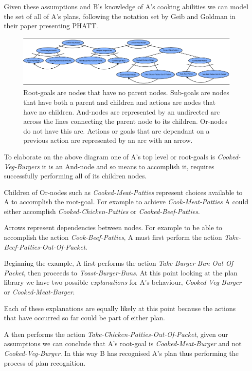 \documentclass[parskip]{cs4rep}
\begin{document}
Given these assumptions and B's knowledge of A's cooking abilities we can model the set of all of A's plans, following the notation set by Geib and Goldman in their paper presenting PHATT.

\begin{figure}[h]
\centerline{
	\includegraphics{images/example-plan-library}
}
\caption{Root-goals are nodes that have no parent nodes. Sub-goals are nodes that have both a parent and children and actions are nodes that have no children. And-nodes are represented by an undirected arc across the lines connecting the parent node to its children. Or-nodes do not have this arc. Actions or goals that are dependant on a previous action are represented by an arc with an arrow.}
\label{fig:example-plan-library}
\end{figure}

To elaborate on the above diagram one of A's top level or root-goals is \textit{Cooked-Veg-Burgers} it is an And-node and so means to accomplish it, requires successfully performing all of its children nodes. 

Children of Or-nodes such as \textit{Cooked-Meat-Patties} represent choices available to A to accomplish the root-goal. For example to achieve \textit{Cook-Meat-Patties} A could either accomplish \textit{Cooked-Chicken-Patties} or \textit{Cooked-Beef-Patties}.

Arrows represent dependencies between nodes. For example to be able to accomplish the action \textit{Cook-Beef-Patties}, A must first perform the action \textit{Take-Beef-Patties-Out-Of-Packet}.

Beginning the example, A first performs the action \textit{Take-Burger-Bun-Out-Of-Packet}, then proceeds to \textit{Toast-Burger-Buns}. At this point looking at the plan library we have two possible \textit{explanations} for A's behaviour, \textit{Cooked-Veg-Burger} or \textit{Cooked-Meat-Burger}.

Each of these explanations are equally likely at this point because the actions that have occurred so far could be part of either plan.

A then performs the action \textit{Take-Chicken-Patties-Out-Of-Packet}, given our assumptions we can conclude that A's root-goal is \textit{Cooked-Meat-Burger} and not \textit{Cooked-Veg-Burger}. In this way B has recognised A's plan thus performing the process of plan recognition.
\end{document}
